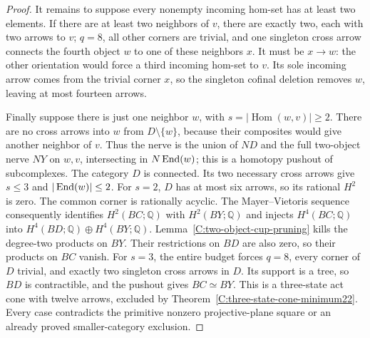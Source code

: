 \begin{proof}
It remains to suppose every nonempty incoming hom-set has at
least two elements. If there are at least two neighbors of
$v$, there are exactly two, each with two arrows to $v$;
$q=8$, all other corners are trivial, and one singleton cross
arrow connects the fourth object $w$ to one of these neighbors
$x$. It must be $x\to w$: the other orientation would force
a third incoming hom-set to $v$. Its sole incoming arrow
comes from the trivial corner $x$, so the singleton cofinal
deletion removes $w$, leaving at most fourteen arrows.

Finally suppose there is just one neighbor $w$, with
$s=|\operatorname{Hom}(w,v)|\geq2$. There are no cross arrows
into $w$ from $D\setminus\{w\}$, because their composites
would give another neighbor of $v$. Thus the nerve is the
union of $ND$ and the full two-object nerve $NY$ on $w,v$,
intersecting in $N\operatorname{End}(w)$; this is a homotopy pushout of
subcomplexes. The category $D$ is connected. Its two necessary
cross arrows give $s\leq3$ and $|\operatorname{End}(w)|\leq2$.
For $s=2$, $D$ has at most six arrows, so its rational $H^2$
is zero. The common corner is rationally acyclic. The
Mayer--Vietoris sequence consequently identifies $H^2(BC;\mathbb Q)$
with $H^2(BY;\mathbb Q)$ and injects $H^4(BC;\mathbb Q)$
into $H^4(BD;\mathbb Q)\oplus H^4(BY;\mathbb Q)$.
Lemma~\ref{C:two-object-cup-pruning} kills the degree-two
products on $BY$. Their restrictions on $BD$ are also zero,
so their products on $BC$ vanish.
For $s=3$, the entire budget forces $q=8$, every corner of
$D$ trivial, and exactly two singleton cross arrows in $D$.
Its support is a tree, so $BD$ is contractible, and the
pushout gives $BC\simeq BY$. This is a three-state act cone
with twelve arrows, excluded by
Theorem~\ref{C:three-state-cone-minimum22}.
Every case contradicts the primitive nonzero projective-plane
square or an already proved smaller-category exclusion.
\end{proof}
